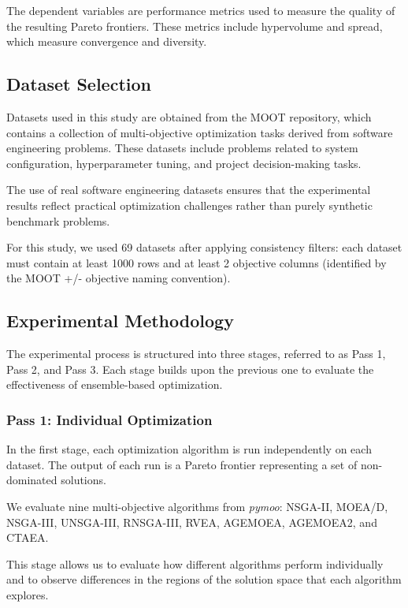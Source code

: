 \documentclass[sigconf,authorversion,nonacm]{acmart}
\begin{document}
The dependent variables are performance metrics used to measure the 
quality of the resulting Pareto frontiers. These metrics include 
hypervolume and spread, which measure convergence and diversity.

\subsection{Dataset Selection}

Datasets used in this study are obtained from the MOOT repository, 
which contains a collection of multi-objective optimization tasks 
derived from software engineering problems. These datasets include 
problems related to system configuration, hyperparameter tuning, 
and project decision-making tasks.

The use of real software engineering datasets ensures that the 
experimental results reflect practical optimization challenges 
rather than purely synthetic benchmark problems.

For this study, we used 69 datasets after applying consistency filters: 
each dataset must contain at least 1000 rows and at least 2 objective 
columns (identified by the MOOT +/- objective naming convention).


\subsection{Experimental Methodology}

The experimental process is structured into three stages, referred to 
as Pass 1, Pass 2, and Pass 3. Each stage builds upon the previous one 
to evaluate the effectiveness of ensemble-based optimization.

\subsubsection{Pass 1: Individual Optimization}

In the first stage, each optimization algorithm is run independently 
on each dataset. The output of each run is a Pareto frontier representing 
a set of non-dominated solutions.

We evaluate nine multi-objective algorithms from \textit{pymoo}: NSGA-II, 
MOEA/D, NSGA-III, UNSGA-III, RNSGA-III, RVEA, AGEMOEA, AGEMOEA2, and CTAEA.

This stage allows us to evaluate how different algorithms perform 
individually and to observe differences in the regions of the solution 
space that each algorithm explores.
\end{document}
